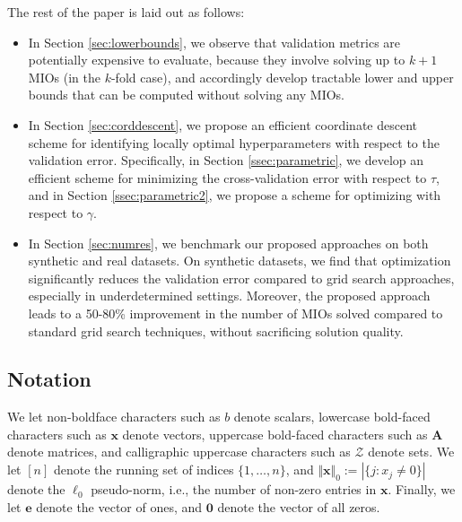 \documentclass[ijoc,noblindrev]{informs3} %
\begin{document}
The rest of the paper is laid out as follows:
\begin{itemize}\color{black}
\item In Section \ref{sec:lowerbounds}, we observe that validation metrics are potentially expensive to evaluate, because they involve solving up to {\color{black}$k+1$} MIOs (in the $k$-fold case), and accordingly develop tractable lower and upper bounds that can be computed without solving any MIOs.
\item In Section \ref{sec:corddescent}, we propose an efficient coordinate descent scheme for identifying locally optimal hyperparameters with respect to the validation error. Specifically, in Section \ref{ssec:parametric}, we develop an efficient scheme for minimizing the {\color{black}cross-validation} error with respect to $\tau$, and in Section \ref{ssec:parametric2}, we propose a scheme for optimizing with respect to $\gamma$.
\item In Section \ref{sec:numres}, we benchmark our proposed approaches on both synthetic and real datasets. On synthetic datasets, we find that optimization significantly reduces the validation error compared to grid search approaches, especially in underdetermined settings. Moreover, the proposed approach leads to a 50-80\% improvement in the number of MIOs solved compared to standard grid search techniques, without sacrificing solution quality.
\end{itemize}

\subsection*{Notation} We let non-boldface characters such as $b$ denote scalars, lowercase bold-faced characters such as $\bm{x}$ denote vectors, uppercase bold-faced characters such as $\bm{A}$ denote matrices, and calligraphic uppercase characters such as $\mathcal{Z}$ denote sets. We let $[n]$ denote the running set of indices $\{1, \dots, n\}$, and $\Vert \bm{x}\Vert_0:=|\{j: x_j \neq 0\}|$ denote the $\ell_0$ pseudo-norm, i.e., the number of non-zero entries in $\bm{x}$. Finally, we let $\bm{e}$ denote the vector of ones, and $\bm{0}$ denote the vector of all zeros. 

\end{document}

